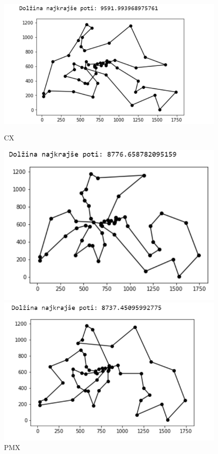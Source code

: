 \documentclass[12pt,a4paper]{amsart}
\theoremstyle{definition} %
\theoremstyle{plain} %
\begin{document}
\begin{figure}[h!]
\begin{minipage}[t]{0.48\textwidth}
\includegraphics[width=\linewidth,keepaspectratio=true]{CX-primer}
\caption{CX}
\label{CX}
\end{minipage}
\hspace*{\fill} %
\begin{minipage}[t]{0.48\textwidth}
\includegraphics[width=\linewidth,keepaspectratio=true]{PMX-primer}
\caption{PMX}
\label{PMX}
\end{minipage}
\hspace*{\fill} %
\begin{minipage}[t]{0.48\textwidth}
\includegraphics[width=\linewidth,keepaspectratio=true]{OX-primer}

\end{minipage}
\end{figure}
\end{document}
